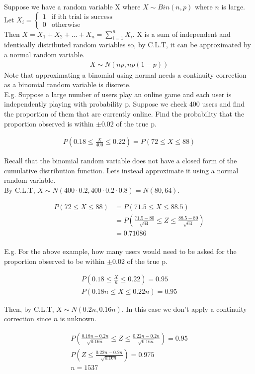 \documentclass[12pt, letterpaper]{article}
\begin{document}
Suppose we have a random variable X where $X \sim Bin(n, p)$ where $n$ is large.\\

Let $X_i = \begin{cases}
1 & \text{if ith trial is success}\\
0 & \text{otherwise}
\end{cases}$\\

Then $X = X_1 + X_2 + ... + X_n = \sum\limits_{i = 1}^{n} X_i$. X is a sum of independent and identically distributed random variables so, by C.L.T, it can be approximated by a normal random variable.
\begin{align*}
X \sim N(np, np(1 - p))
\end{align*}
Note that approximating a binomial using normal needs a continuity correction as a binomial random variable is discrete.\\

E.g. Suppose a large number of users play an online game and each user is independently playing with probability p. Suppose we check 400 users and find the proportion of them that are currently online. Find the probability that the proportion observed is within $\pm 0.02$ of the true p.

\begin{align*}
P\left(0.18 \leq \frac{X}{400} \leq 0.22\right) = P\left(72 \leq X \leq 88\right)
\end{align*}

Recall that the binomial random variable does not have a closed form of the cumulative distribution function. Lets instead approximate it using a normal random variable.\\

By C.L.T, $X \sim N(400 \cdot 0.2, 400 \cdot 0.2 \cdot 0.8) = N(80, 64)$.

\begin{align*}
P\left(72 \leq X \leq 88\right) &= P\left(71.5 \leq X \leq 88.5\right)\\
&= P\left(\frac{71.5 - 80}{\sqrt{64}} \leq Z \leq \frac{88.5 - 80}{\sqrt{64}}\right)\\
&= 0.71086
\end{align*}\\

E.g. For the above example, how many users would need to be asked for the proportion observed to be within $\pm 0.02$ of the true p.

\begin{align*}
P\left(0.18 \leq \frac{X}{n} \leq 0.22\right) = 0.95\\
P\left(0.18n \leq X \leq 0.22n\right) = 0.95
\end{align*}

Then, by C.L.T, $X \sim N(0.2n, 0.16n)$. In this case we don't apply a continuity correction since $n$ is unknown.

\begin{align*}
P\left(\frac{0.18n - 0.2n}{\sqrt{0.16n}} \leq Z \leq \frac{0.22n - 0.2n}{\sqrt{0.16n}}\right) = 0.95\\
P\left(Z \leq \frac{0.22n - 0.2n}{\sqrt{0.16n}}\right) = 0.975\\
n = 1537
\end{align*}
\end{document}
